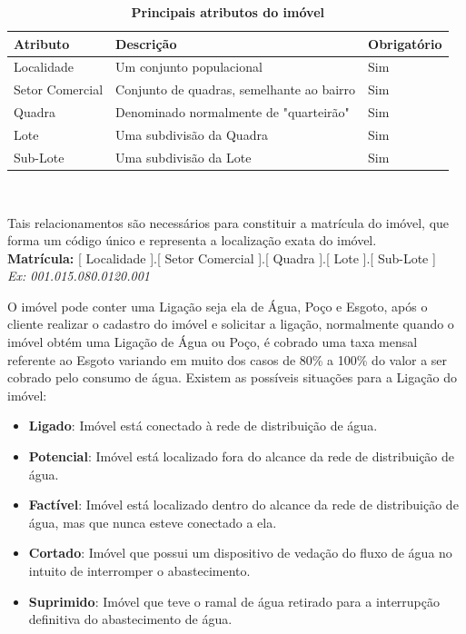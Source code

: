 \begin{table}[H]
	\footnotesize
	\caption{\textbf{Principais atributos do imóvel}}
	\label{tabela:atributosImovel}
	\begin{tabular}{|p{3cm}|p{7cm}|p{2.5cm}|} \hline
		\textbf{Atributo} 	& \textbf{Descrição}						& \textbf{Obrigatório}  \\ \hline
		Localidade 			& Um conjunto populacional					& Sim \\	\hline
		Setor Comercial 	& Conjunto de quadras, semelhante ao bairro & Sim \\ 	\hline
		Quadra 				& Denominado normalmente de "quarteirão" 	& Sim \\ 	\hline			
		Lote 				&  Uma subdivisão da Quadra 				& Sim \\ 	\hline
		Sub-Lote 			&  Uma subdivisão da Lote 					& Sim \\ 	\hline
	\end{tabular}\\[6pt]
	\fontsize{10}{12}\selectfont {Fonte: Autoria Própria.}
\end{table}


Tais relacionamentos são necessários para constituir a matrícula do imóvel, que forma um código único e representa a localização exata do imóvel.\\
\textbf{Matrícula:} [ Localidade ].[ Setor Comercial ].[ Quadra ].[ Lote ].[ Sub-Lote ]  \\
\textit{Ex: 001.015.080.0120.001}

O imóvel pode conter uma Ligação seja ela de Água, Poço e Esgoto, após o cliente realizar o cadastro do imóvel e solicitar a ligação, normalmente quando o imóvel obtém uma Ligação de Água ou Poço, é cobrado uma taxa mensal referente ao Esgoto variando em muito dos casos de 80\% a 100\% do valor a ser cobrado pelo consumo de água. Existem as possíveis situações para a Ligação do imóvel:
\begin{itemize}
	\item \textbf{Ligado}: Imóvel está conectado à rede de distribuição de água.
	\item \textbf{Potencial}: Imóvel está localizado fora do alcance da rede de distribuição de água.
	\item \textbf{Factível}: Imóvel está localizado dentro do alcance da rede de distribuição de água, mas que nunca esteve conectado a ela.
	\item \textbf{Cortado}: Imóvel que possui um dispositivo de vedação do fluxo de água no intuito de interromper o abastecimento.
	\item \textbf{Suprimido}: Imóvel que teve o ramal de água retirado para a interrupção definitiva do abastecimento de água.	
\end{itemize}

